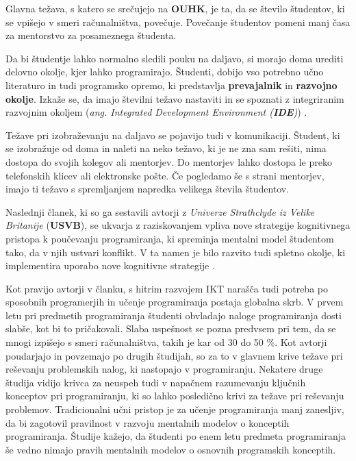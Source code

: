 Glavna težava, s katero se srečujejo na \textbf{OUHK}, je ta, da se
število študentov, ki se vpišejo v smeri računalništva,
povečuje. Povečanje študentov pomeni manj časa za mentorstvo za
posameznega študenta.

Da bi študentje lahko normalno sledili pouku na daljavo, si morajo
doma urediti delovno okolje, kjer lahko programirajo. Študenti,
dobijo vso potrebno učno literaturo in tudi programsko opremo, ki
predstavlja \textbf{prevajalnik} in \textbf{razvojno okolje}. Izkaže se,
da imajo številni težavo nastaviti in se spoznati z integriranim
razvojnim okoljem (\emph{ang. Integrated Development Environment
  (\textbf{IDE})}) \cite{ITaLCP_DistanceEdu}.

Težave pri izobraževanju na daljavo se pojavijo tudi v
komunikaciji. Študent, ki se izobražuje od doma in naleti na neko
težavo, ki je ne zna sam rešiti, nima dostopa do svojih kolegov ali
mentorjev. Do mentorjev lahko dostopa le preko telefonskih klicev ali
elektronske pošte. Če pogledamo še s strani mentorjev, imajo ti težavo
s spremljanjem napredka velikega števila študentov.


Naslednji članek, ki so ga sestavili avtorji z \emph{Univerze
  Strathclyde iz Velike Britanije} (\textbf{USVB}), se ukvarja z
raziskovanjem vpliva nove strategije kognitivnega pristopa k
poučevanju programiranja, ki spreminja mentalni model študentom tako,
da v njih ustvari konflikt. V ta namen je bilo razvito tudi spletno
okolje, ki implementira uporabo nove kognitivne strategije
\cite{mentalModels}.


Kot pravijo avtorji v članku, s hitrim razvojem IKT narašča tudi
potreba po sposobnih programerjih in učenje programiranja postaja
globalna skrb. V prvem letu pri predmetih programiranja študenti
obvladajo naloge programiranja dosti slabše, kot bi to
pričakovali. Slaba uspešnost se pozna predvsem pri tem, da se mnogi
izpišejo s smeri računalništva, takih je kar od 30 do 50 \%. Kot
avtorji poudarjajo in povzemajo po drugih študijah, so za to v glavnem
krive težave pri reševanju problemskih nalog, ki nastopajo v
programiranju. Nekatere druge študija vidijo krivca za neuspeh tudi v
napačnem razumevanju ključnih konceptov pri programiranju, ki so lahko
posledično krivi za težave pri reševanju problemov. Tradicionalni učni
pristop je za učenje programiranja manj zanesljiv, da bi zagotovil
pravilnost v razvoju mentalnih modelov o konceptih
programiranja. Študije kažejo, da študenti po enem letu predmeta
programiranja še vedno nimajo pravih mentalnih modelov o osnovnih
programskih konceptih.

